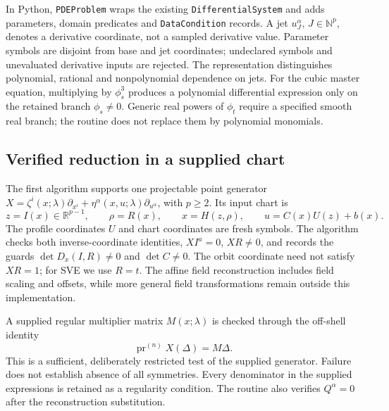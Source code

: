 \documentclass[11pt]{article}
\newcommand{\pr}{\operatorname{pr}}
\begin{document}
In Python, \texttt{PDEProblem} wraps the existing \texttt{DifferentialSystem}
and adds parameters, domain predicates and \texttt{DataCondition} records.
A jet $u^\alpha_J$, $J\in\mathbb N^p$, denotes a derivative coordinate, not a
sampled derivative value. Parameter symbols are disjoint from base and jet
coordinates; undeclared symbols and unevaluated derivative inputs are rejected.
The representation distinguishes polynomial, rational and nonpolynomial
dependence on jets. For the cubic master equation, multiplying by
$\phi_s^3$ produces a polynomial differential expression only on the retained
branch $\phi_s\ne0$. Generic real powers of $\phi_t$ require a specified smooth
real branch; the routine does not replace them by polynomial monomials.

\subsection{Verified reduction in a supplied chart}
The first algorithm supports one projectable point generator
$X=\zeta^i(x;\lambda)\partial_{x^i}
+\eta^\alpha(x,u;\lambda)\partial_{u^\alpha}$, with $p\ge2$.
Its input chart is
\begin{equation}
z=I(x)\in\mathbb R^{p-1},\qquad \rho=R(x),\qquad
x=H(z,\rho),\qquad u=C(x)U(z)+b(x).
\label{eq:reduction-chart}
\end{equation}
The profile coordinates $U$ and chart coordinates are fresh symbols.
The algorithm checks both inverse-coordinate identities, $XI^a=0$,
$XR\ne0$, and records the guards
$\det D_x(I,R)\ne0$ and $\det C\ne0$.
The orbit coordinate need not satisfy $XR=1$; for SVE we use $R=t$.
The affine field reconstruction includes field scaling and offsets, while
more general field transformations remain outside this implementation.

A supplied regular multiplier matrix $M(x;\lambda)$ is checked through the
off-shell identity
\begin{equation}
\pr^{(n)}X(\Delta)=M\Delta.
\label{eq:multiplier-identity}
\end{equation}
This is a sufficient, deliberately restricted test of the supplied generator.
Failure does not establish absence of all symmetries. Every denominator in
the supplied expressions is retained as a regularity condition. The routine
also verifies $Q^\alpha=0$ after the reconstruction substitution.
\end{document}
